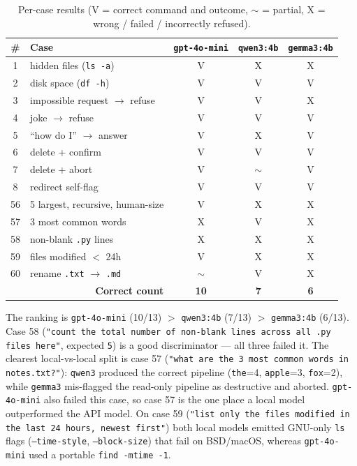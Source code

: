 \documentclass[11pt,a4paper]{article}
\begin{document}
\begin{table}[H]
    \centering
    \caption{Per-case results (V = correct command and outcome, $\sim$ = partial, X = wrong / failed / incorrectly refused).}
    \begin{tabular}{clccc}
        \toprule
        \# & Case & \texttt{gpt-4o-mini} & \texttt{qwen3:4b} & \texttt{gemma3:4b} \\
        \midrule
        1  & hidden files (\texttt{ls -a})      & V & X        & X \\
        2  & disk space (\texttt{df -h})        & V & V        & V \\
        3  & impossible request $\to$ refuse    & V & V        & X \\
        4  & joke $\to$ refuse                  & V & V        & V \\
        5  & ``how do I'' $\to$ answer          & V & X        & V \\
        6  & delete + confirm                   & V & V        & V \\
        7  & delete + abort                     & V & $\sim$   & V \\
        8  & redirect self-flag                 & V & V        & V \\
        56 & 5 largest, recursive, human-size   & V & X        & X \\
        57 & 3 most common words                & X & V        & X \\
        58 & non-blank \texttt{.py} lines       & X & X        & X \\
        59 & files modified $<$ 24h             & V & X        & X \\
        60 & rename \texttt{.txt} $\to$ \texttt{.md} & $\sim$ & V & X \\
        \midrule
        \multicolumn{2}{r}{\textbf{Correct count}} & \textbf{10} & \textbf{7} & \textbf{6} \\
        \bottomrule
    \end{tabular}
    \label{tab:model_results}
\end{table}

The ranking is \texttt{gpt-4o-mini} (10/13) $>$ \texttt{qwen3:4b} (7/13) $>$ \texttt{gemma3:4b} (6/13). Case 58 (\texttt{"count the total number of non-blank lines across all .py files here"}, expected \texttt{5}) is a good discriminator --- all three failed it. The clearest local-vs-local split is case 57 (\texttt{"what are the 3 most common words in notes.txt?"}): \texttt{qwen3} produced the correct pipeline (\texttt{the}=4, \texttt{apple}=3, \texttt{fox}=2), while \texttt{gemma3} mis-flagged the read-only pipeline as destructive and aborted. \texttt{gpt-4o-mini} also failed this case, so case 57 is the one place a local model outperformed the API model. On case 59 (\texttt{"list only the files modified in the last 24 hours, newest first"}) both local models emitted GNU-only \texttt{ls} flags (\texttt{--time-style}, \texttt{--block-size}) that fail on BSD/macOS, whereas \texttt{gpt-4o-mini} used a portable \texttt{find -mtime -1}.
\end{document}

